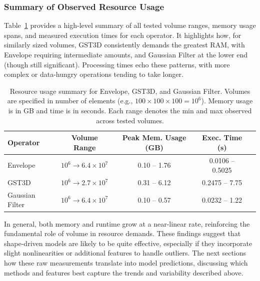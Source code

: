 \subsubsection{Summary of Observed Resource Usage}
\label{subsec:resource-usage-summary}

Table~\ref{tab:operator_summary_aggregates} provides a high-level summary of all tested volume ranges, memory usage spans, and measured execution times for each operator.
It highlights how, for similarly sized volumes, \ac{GST3D} consistently demands the greatest  \ac{RAM}, with Envelope requiring intermediate amounts, and Gaussian Filter at the lower end (though still significant).
Processing times echo these patterns, with more complex or data-hungry operations tending to take longer.

\begin{table}[htbp]
    \centering
    \begin{tabular}{lcccc}
        \hline
        \textbf{Operator} & \textbf{Volume Range} & \textbf{Peak Mem. Usage (GB)} & \textbf{Exec. Time (s)} \\ \hline
        Envelope &
        $10^6 \!\to\! 6.4\times10^7$ &
        0.10 -- 1.76 &
        0.0106 -- 0.5025 \\
        \ac{GST3D} &
        $10^6 \!\to\! 2.7\times10^7$ &
        0.31 -- 6.12 &
        0.2475 -- 7.75 \\
        Gaussian Filter &
        $10^6 \!\to\! 6.4\times10^7$ &
        0.10 -- 0.57 &
        0.0232 -- 1.22 \\
        \hline
    \end{tabular}
    \caption{Resource usage summary for Envelope, \ac{GST3D}, and Gaussian Filter.
    Volumes are specified in number of elements (e.g., $100 \times 100 \times 100 = 10^6$).
    Memory usage is in GB and time is in seconds.
    Each range denotes the min and max observed across tested volumes.}
    \label{tab:operator_summary_aggregates}
\end{table}

In general, both memory and runtime grow at a near-linear rate, reinforcing the fundamental role of volume in resource demands.
These findings suggest that shape-driven models are likely to be quite effective, especially if they incorporate slight nonlinearities or additional features to handle outliers.
The next sections  how these raw measurements translate into model predictions, discussing which methods and features best capture the trends and variability described above.

